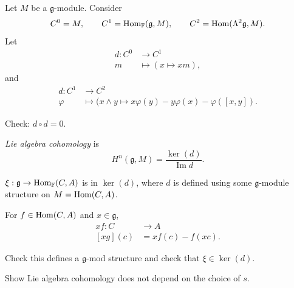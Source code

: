 \medskip\noindent
Let $M$ be a $\mathfrak{g}$-module.
Consider
$$
\begin{aligned}
C^0 = M, \qquad 
C^1 = \mathop{\mathrm{Hom}}\nolimits_{\mathbb{F}}(\mathfrak{g},M),\qquad 
C^2 = \mathop{\mathrm{Hom}}\nolimits(\Lambda^2\mathfrak{g},M).
\end{aligned}
$$
Let
$$
\begin{aligned}
d: C^0 &\longrightarrow C^1 \\
m &\longmapsto (x \mapsto xm),
\end{aligned}
$$
and
$$
\begin{aligned}
d: C^1 &\longrightarrow C^2 \\
\varphi &\longmapsto 
(x \wedge y \mapsto 
x \varphi(y) - y \varphi(x)-
\varphi([x,y]).
\end{aligned}
$$

Check: $d \circ d =0$.

\begin{definition}
\label{definition-lie-algebra-cohomology}
{\it Lie algebra cohomology} is
$$
H^n(\mathfrak{g},M)
=
\frac{\ker(d)}{\operatorname{Im}d}.
$$
\end{definition}

\begin{lemma}
\label{lemma-xi}
$\xi:\mathfrak{g} \to
\mathop{\mathrm{Hom}}\nolimits_{\mathbb{F}}(C,A)$ is in $\ker(d)$,
where $d$ is defined using some
$\mathfrak{g}$-module structure on
$M=\mathop{\mathrm{Hom}}\nolimits(C,A)$.
\end{lemma}

\noindent
For $f \in \mathop{\mathrm{Hom}}\nolimits(C,A)$ and
$x \in \mathfrak{g}$,
$$
\begin{aligned}
xf: C &\longrightarrow A \\
[xg](c) &= xf(c) - f(xc).
\end{aligned}
$$

\begin{exercise}
\label{exercise-g-mod-structure}
Check this defines a $\mathfrak{g}$-mod
structure and check that $\xi \in \ker(d)$.
\end{exercise}

\begin{exercise}
\label{exercise-does-not-depend}
Show Lie algebra cohomology does not
depend on the choice of $s$.
\end{exercise}











